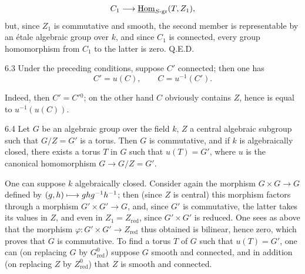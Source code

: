 \[
C_1\longrightarrow\underline{\operatorname{Hom}}_{S\text{-gr}}(T,Z_1),
\]
but, since $Z_1$ is commutative and smooth, the second member is representable by an étale algebraic group over $k$, and since $C_1$ is connected, every group homomorphism from $C_1$ to the latter is zero. \hfill Q.E.D.
\begin{corollary}{6.3}\label{XII.6.3}
Under the preceding conditions, suppose $C'$ connected; then one has
\[
C'=u(C),\qquad C=u^{-1}(C').
\]
\end{corollary}
Indeed, then $C'=C'{}^0$; on the other hand $C$ obviously contains $Z$, hence is equal to $u^{-1}(u(C))$.
\begin{lemma}{6.4}\label{XII.6.4}
Let $G$ be an algebraic group over the field $k$, $Z$ a central algebraic subgroup such that $G/Z=G'$ is a torus. Then $G$ is commutative, and if $k$ is algebraically closed, there exists a torus $T$ in $G$ such that $u(T)=G'$, where $u$ is the canonical homomorphism $G\to G/Z=G'$.
\end{lemma}
One can suppose $k$ algebraically closed. Consider again the morphism $G\times G\to G$ defined by $(g,h)\longmapsto ghg^{-1}h^{-1}$; then (since $Z$ is central) this morphism factors through a morphism $G'\times G'\to G$, and, since $G'$ is commutative, the latter takes its values in $Z$, and even in $Z_1=Z_{\mathrm{red}}$, since $G'\times G'$ is reduced. One sees as above that the morphism $\varphi:G'\times G'\to Z_{\mathrm{red}}$ thus obtained is bilinear, hence zero, which proves that $G$ is commutative. To find a torus $T$ of $G$ such that $u(T)=G'$, one can (on replacing $G$ by $G_{\mathrm{red}}^0$) suppose $G$ smooth and connected, and in addition (on replacing $Z$ by $Z_{\mathrm{red}}^0$) that $Z$ is smooth and connected.
